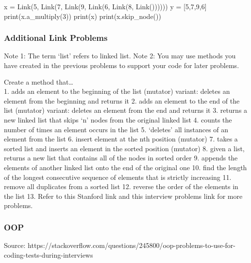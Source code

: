 \documentclass[11pt]{article}
\newenvironment{Shaded}{}{}
\newcommand{\DecValTok}[1]{\textcolor[rgb]{0.25,0.63,0.44}{{#1}}}
\newcommand{\NormalTok}[1]{{#1}}
\newcommand{\OperatorTok}[1]{\textcolor[rgb]{0.40,0.40,0.40}{{#1}}}
\newcommand{\BuiltInTok}[1]{{#1}}
\begin{document}
\begin{Shaded}
\begin{Highlighting}[]
        
\NormalTok{x }\OperatorTok{=}\NormalTok{ Link(}\DecValTok{5}\NormalTok{, Link(}\DecValTok{7}\NormalTok{, Link(}\DecValTok{9}\NormalTok{, Link(}\DecValTok{6}\NormalTok{, Link(}\DecValTok{8}\NormalTok{, Link())))))}
\NormalTok{y }\OperatorTok{=}\NormalTok{ [}\DecValTok{5}\NormalTok{,}\DecValTok{7}\NormalTok{,}\DecValTok{9}\NormalTok{,}\DecValTok{6}\NormalTok{]}
\BuiltInTok{print}\NormalTok{(x.a_multiply(}\DecValTok{3}\NormalTok{))}
\BuiltInTok{print}\NormalTok{(x)}
\BuiltInTok{print}\NormalTok{(x.skip_node())}
\end{Highlighting}
\end{Shaded}

\subsubsection{Additional Link Problems}\label{additional-link-problems}

Note 1: The term `list' refers to linked list. Note 2: You may use
methods you have created in the previous problems to support your code
for later problems.

Create a method that\ldots{}\\
1. adds an element to the beginning of the list (mutator) variant:
deletes an element from the beginning and returns it 2. adds an element
to the end of the list (mutator) variant: deletes an element from the
end and returns it 3. returns a new linked list that skips `n' nodes
from the original linked list 4. counts the number of times an element
occurs in the list 5. `deletes' all instances of an element from the
list 6. insert element at the nth position (mutator) 7. takes a sorted
list and inserts an element in the sorted position (mutator) 8. given a
list, returns a new list that contains all of the nodes in sorted order
9. appends the elements of another linked list onto the end of the
original one 10. find the length of the longest consecutive sequence of
elements that is strictly increasing 11. remove all duplicates from a
sorted list 12. reverse the order of the elements in the list 13. Refer
to this Stanford link and this interview problems link for more
problems.

    \subsubsection{OOP}\label{oop}

Source:
https://stackoverflow.com/questions/245800/oop-problems-to-use-for-coding-tests-during-interviews
\end{document}
